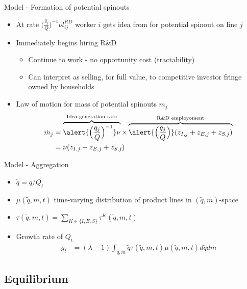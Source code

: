 \documentclass[english,usenames,dvipsnames]{beamer}
\begin{document}
\begin{frame}{Model - Formation of potential spinouts}
\begin{itemize}
	\item At rate $\Big(\frac{q_j}{Q}\Big)^{-1} \nu l_{ij}^{RD}$ worker $i$ gets idea from for potential spinout on line $j$
	\item Immediately begins hiring R\&D 
	\begin{itemize}
		\item Continue to work - no opportunity cost (tractability) 
		\item Can interpret as selling, for full value, to competitive investor fringe owned by households
	\end{itemize}
	\item Law of motion for mass of potential spinouts $m_j$  
	\begin{align*}
		\dot{m}_j &= \overbrace{\alert{\Big(\frac{q_j}{Q}\Big)^{-1}} \nu}^{\textrm{Idea generation rate}} \times \overbrace{\alert{\Big(\frac{q_j}{Q}\Big) }(z_{I,j} + z_{E,j} + z_{S,j})}^{\textrm{R\&D employoment}} \\
		                    &= \nu (z_{I,j} + z_{E,j} + z_{S,j})
	\end{align*}
\end{itemize}
\end{frame}

\begin{frame}{Model - Aggregation}
\begin{itemize}
	\item $\tilde{q} = q/Q_t$
	\item $\mu(\tilde{q},m,t)$ time-varying distribution of product lines in $(\tilde{q},m)$-space 
	\item $\tau(\tilde{q},m,t) = \sum_{K \in \{I,E,S\}} \tau^K(\tilde{q},m,t)$
	\item Growth rate of $Q_t$
	\begin{align*}
		g_t &= (\lambda -1) \int_{\tilde{q},m} \tilde{q} \tau(\tilde{q},m,t) \mu(\tilde{q},m,t) d\tilde{q}dm
	\end{align*}
\end{itemize}
\end{frame}


\subsection{Equilibrium}

\end{document}
